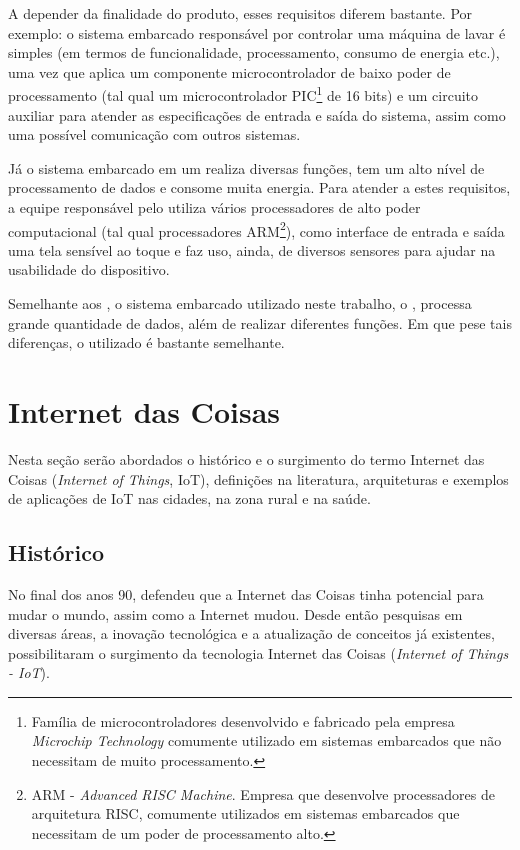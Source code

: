 A depender da finalidade do produto, esses requisitos diferem bastante. Por
exemplo: o sistema embarcado responsável por controlar uma máquina de lavar é
simples (em termos de funcionalidade, processamento, consumo de energia etc.),
uma vez que aplica um componente microcontrolador de baixo poder de
processamento (tal qual um microcontrolador PIC\footnote{Família de
microcontroladores desenvolvido e fabricado pela empresa \textit{Microchip
Technology} comumente utilizado em sistemas embarcados que não necessitam de
muito processamento.} de 16 bits) e um circuito auxiliar para atender as
especificações de entrada e saída do sistema, assim como uma possível
comunicação com outros sistemas.

Já o sistema embarcado em um \smartphone[] realiza diversas funções, tem um
alto nível de processamento de dados e consome muita energia. Para atender a
estes requisitos, a equipe responsável pelo \design[] utiliza vários
processadores de alto poder computacional (tal qual processadores
ARM\footnote{ARM - \textit{Advanced RISC Machine}. Empresa que desenvolve 
processadores de arquitetura RISC, comumente utilizados em sistemas
embarcados que necessitam de um poder de processamento alto.}), como interface
de entrada e saída uma tela sensível ao toque e faz uso, ainda, de diversos
sensores para ajudar na usabilidade do dispositivo.

Semelhante aos \smartphones, o sistema embarcado utilizado neste trabalho, o
\stb[], processa grande quantidade de dados, além de realizar
diferentes funções. Em que pese tais diferenças, o \hardware[] utilizado é
bastante semelhante.

\section{Internet das Coisas} \label{sec:iot}

Nesta seção serão abordados o histórico e o surgimento do termo
Internet das Coisas (\textit{Internet of Things}, IoT), definições
na literatura, arquiteturas e exemplos de aplicações de IoT nas cidades,
na zona rural e na saúde.

\subsection{Histórico} \label{subsec:iot-historico}

No final dos anos 90,  defendeu que a Internet
das Coisas tinha potencial para mudar o mundo, assim como a Internet mudou.
Desde então pesquisas em diversas áreas, a inovação tecnológica e a atualização
de conceitos já existentes, possibilitaram o surgimento da tecnologia Internet das
Coisas (\textit{Internet of Things - IoT}).


